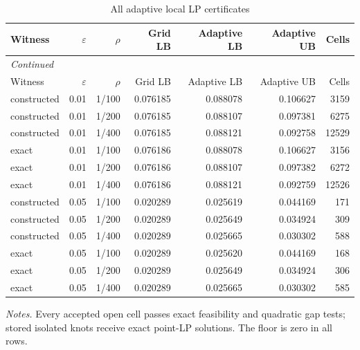 {\small\setlength{\tabcolsep}{4pt}\begin{longtable}{lrrrrrr}
\caption{All adaptive local LP certificates}\label{tab:all_local}\\
\toprule
Witness & $\varepsilon$ & $\rho$ & Grid LB & Adaptive LB & Adaptive UB & Cells \\
\midrule\endfirsthead
\multicolumn{7}{l}{\emph{Continued}}\\\toprule
Witness & $\varepsilon$ & $\rho$ & Grid LB & Adaptive LB & Adaptive UB & Cells \\
\midrule\endhead
constructed & 0.01 & 1/100 & 0.076185 & 0.088078 & 0.106627 & 3159 \\
constructed & 0.01 & 1/200 & 0.076185 & 0.088107 & 0.097381 & 6275 \\
constructed & 0.01 & 1/400 & 0.076185 & 0.088121 & 0.092758 & 12529 \\
exact & 0.01 & 1/100 & 0.076186 & 0.088078 & 0.106627 & 3156 \\
exact & 0.01 & 1/200 & 0.076186 & 0.088107 & 0.097382 & 6272 \\
exact & 0.01 & 1/400 & 0.076186 & 0.088121 & 0.092759 & 12526 \\
constructed & 0.05 & 1/100 & 0.020289 & 0.025619 & 0.044169 & 171 \\
constructed & 0.05 & 1/200 & 0.020289 & 0.025649 & 0.034924 & 309 \\
constructed & 0.05 & 1/400 & 0.020289 & 0.025665 & 0.030302 & 588 \\
exact & 0.05 & 1/100 & 0.020289 & 0.025620 & 0.044169 & 168 \\
exact & 0.05 & 1/200 & 0.020289 & 0.025649 & 0.034924 & 306 \\
exact & 0.05 & 1/400 & 0.020289 & 0.025665 & 0.030302 & 585 \\
\bottomrule\end{longtable}}
\noindent\emph{Notes.} Every accepted open cell passes exact feasibility and quadratic gap tests; stored isolated knots receive exact point-LP solutions. The floor is zero in all rows.
